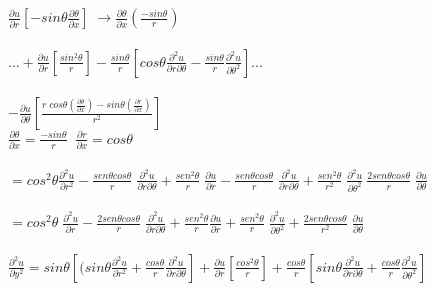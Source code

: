 \documentclass[10pt,a4paper]{report}
\begin{document}
\\
\ \\ $\displaystyle \frac{\partial u}{\partial r} \left[- sin \theta \frac{\partial \theta}{\partial x} \right] \;\rightarrow \frac{\partial \theta}{\partial x} 
 \left(\frac{-sin \theta}{r} \right)$
\\
\ \\ $\displaystyle ... + \frac{\partial u}{\partial r} \left[\frac{sin ^2 \theta}{r}  \right] - \frac{sin \theta}{r} \left[ cos \theta \frac{\partial^2 u}{\partial r \partial \theta} - \frac{sin \theta}{r} \frac{\partial^2 u}{\partial \theta^2} \right]... $ 
\\
\ \\ $\displaystyle - \frac{\partial u}{\partial \theta} \left[ \frac{ r \; cos \theta \left(\frac{\partial \theta}{\partial x} \right) - sin \theta \left(\frac{\partial r}{\partial x} \right) }{r^2} \right]$
\ \\ $\displaystyle \frac{\partial \theta}{\partial x} = \frac{- sin \theta}{r} \; \; \frac{\partial r}{\partial x} = cos \theta$
\\
\ \\ $\displaystyle
= cos^2 \theta \frac{\partial^2 u}{\partial r^2} - \frac{sen \theta cos \theta}{r} \; \frac{\partial^2 u}{\partial r \partial \theta} + \frac{sen^2 \theta}{r} \; \frac{\partial u}{\partial r} - \frac{sen \theta cos \theta}{r} \; \frac{\partial^2 u}{\partial r \partial \theta} + \frac{sen^2 \theta}{r^2} \; \frac{\partial^2 u}{\partial \theta^2} \: \frac{2 sen \theta cos \theta}{r} \; \frac{\partial u}{\partial \theta}$
\\
\ \\ $\displaystyle
= cos^2 \theta \; \frac{\partial^2 u}{\partial r} - \frac{2 sen \theta cos \theta}{r} \; \frac{\partial^2 u}{\partial r \partial \theta} + \frac{sen^2 \theta}{r} \frac{\partial u}{\partial r} + \frac{sen^2 \theta}{r} \; \frac{\partial^2 u}{\partial \theta^2} + \frac{2 sen \theta cos \theta}{r^2}  \; \frac{\partial u}{\partial \theta}$
\\
\ \\ $\displaystyle
\frac{\partial^2 u}{\partial y^2} = sin \theta \left[( sin \theta \frac{\partial^2 u}{\partial r^2} + \frac{cos \theta}{r} \frac{\partial^2 u}{\partial r \partial \theta}\right] + \frac{\partial u}{\partial r} \left[\frac{cos^2 \theta}{r}\right ] + \frac{cos \theta}{r} \left [ sin \theta \frac{\partial^2 u}{\partial r \partial \theta} + \frac{cos\theta}{r} \frac{\partial^2 u}{\partial \theta^2}\right]$
\\
\end{document}
